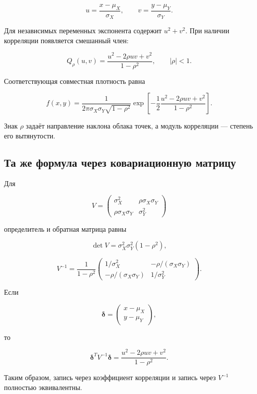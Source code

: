 \documentclass[
  russian,
  12pt,
  a4paper,
  a4paper,
  openany]{scrbook}
\begin{document}
\[
u=\frac{x-\mu_X}{\sigma_X},
\qquad
v=\frac{y-\mu_Y}{\sigma_Y}.
\]

Для независимых переменных экспонента содержит \(u^2+v^2\). При наличии
корреляции появляется смешанный член:

\[
\boxed{
Q_\rho(u,v)
=
\frac{u^2-2\rho uv+v^2}{1-\rho^2},
\qquad
|\rho|<1.
}
\]

Соответствующая совместная плотность равна

\[
\boxed{
f(x,y)
=
\frac{1}{2\pi\sigma_X\sigma_Y\sqrt{1-\rho^2}}
\exp\!\left[
-\frac12
\frac{u^2-2\rho uv+v^2}{1-\rho^2}
\right].
}
\]

Знак \(\rho\) задаёт направление наклона облака точек, а модуль
корреляции --- степень его вытянутости.

\subsection{Та же формула через ковариационную
матрицу}\label{ux442ux430-ux436ux435-ux444ux43eux440ux43cux443ux43bux430-ux447ux435ux440ux435ux437-ux43aux43eux432ux430ux440ux438ux430ux446ux438ux43eux43dux43dux443ux44e-ux43cux430ux442ux440ux438ux446ux443}

Для

\[
V=
\begin{pmatrix}
\sigma_X^2&\rho\sigma_X\sigma_Y\\
\rho\sigma_X\sigma_Y&\sigma_Y^2
\end{pmatrix}
\]

определитель и обратная матрица равны

\[
\det V=\sigma_X^2\sigma_Y^2(1-\rho^2),
\]

\[
V^{-1}
=
\frac{1}{1-\rho^2}
\begin{pmatrix}
1/\sigma_X^2&-\rho/(\sigma_X\sigma_Y)\\
-\rho/(\sigma_X\sigma_Y)&1/\sigma_Y^2
\end{pmatrix}.
\]

Если

\[
\boldsymbol\delta
=
\begin{pmatrix}
x-\mu_X\\
y-\mu_Y
\end{pmatrix},
\]

то

\[
\boxed{
\boldsymbol\delta^TV^{-1}\boldsymbol\delta
=
\frac{u^2-2\rho uv+v^2}{1-\rho^2}.
}
\]

Таким образом, запись через коэффициент корреляции и запись через
\(V^{-1}\) полностью эквивалентны.
\end{document}
